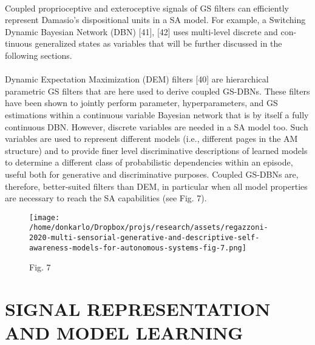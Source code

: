 \documentclass{article}
\begin{document}
		\paragraph{} Coupled proprioceptive and exteroceptive signals of GS
		filters can efficiently represent Damasio’s dispositional units
		in a SA model. For example, a Switching Dynamic Bayesian
		Network (DBN) [41], [42] uses multi-level discrete and con-
		tinuous generalized states as variables that will be further
		discussed in the following sections.
		\paragraph{} Dynamic Expectation Maximization (DEM) filters [40] are
		hierarchical parametric GS filters that are here used to
		derive coupled GS-DBNs. These filters have been shown to
		jointly perform parameter, hyperparameters, and GS estimations within a continuous variable Bayesian network that is
		by itself a fully continuous DBN. However, discrete variables
		are needed in a SA model too. Such variables are used to
		represent different models (i.e., different pages in the AM
		structure) and to provide finer level discriminative descriptions
		of learned models to determine a different class of probabilistic
		dependencies within an episode, useful both for generative
		and discriminative purposes. Coupled GS-DBNs are, therefore,
		better-suited filters than DEM, in particular when all model
		properties are necessary to reach the SA capabilities (see
		Fig. 7).
		\begin{figure*}
			\centering
			\texttt{[image: /home/donkarlo/Dropbox/projs/research/assets/regazzoni-2020-multi-sensorial-generative-and-descriptive-self-awareness-models-for-autonomous-systems-fig-7.png]}
			\caption{\cite{regazzoni-2020-multi-sensorial-generative-and-descriptive-self-awareness-models-for-autonomous-systems}Fig. 7}
			\label{fig:regazzoni-2020-multi-sensorial-generative-and-descriptive-self-awareness-models-for-autonomous-systems-fig-7.png}
		\end{figure*}
	
	\section{ SIGNAL REPRESENTATION AND MODEL LEARNING}
\end{document}
